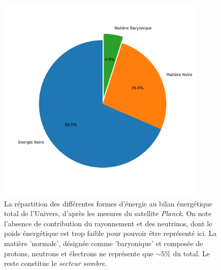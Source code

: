 \begin{figure}[htbp]
	\centering
		\includegraphics[height=10cm]{figs/pieplanck.png}
		\caption[Le bilan énergétique de l'Univers]{La répartition des différentes formes d'énergie au bilan énergétique total de l'Univers, d'après les mesures du satellite \textit{Planck}. On note l'absence de contribution du rayonnement et des neutrinos, dont le poids énergétique est trop faible pour pouvoir être représenté ici. La matière 'normale', désignée comme 'baryonique' et composée de protons, neutrons et électrons ne représente que $\sim 5\%$ du total. Le reste constitue le \textit{secteur sombre}.}
	\label{f:timeline}
\end{figure}


